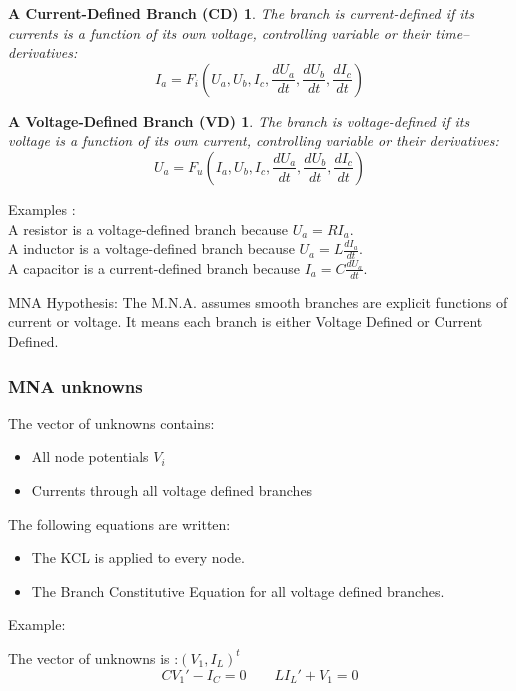 \frame
{
\newtheorem{mur}{A Current-Defined Branch (CD)}
\begin{mur}
The branch is current-defined if its currents is a function of its own voltage, controlling variable
or their time--derivatives:
\begin{equation}\label{CD}I_{a}=F_{i}(U_{a},U_{b},I_{c},\frac{dU_a}{dt},\frac{dU_b}{dt},\frac{dI_{c}}{dt})\end{equation}
\end{mur}
\newtheorem{mur_}{A Voltage-Defined Branch (VD)}
\begin{mur_}
The branch is voltage-defined if its voltage is a function of its own current, controlling variable
or their derivatives:
\begin{equation}\label{VD}U_{a}=F_{u}(I_{a},U_{b},I_{c},\frac{dU_a}{dt},\frac{dU_b}{dt},\frac{dI_{c}}{dt})\end{equation}
\end{mur_}
Examples : \\
A resistor is a voltage-defined branch because $U_{a}=RI_{a}$.\\
A inductor is a voltage-defined branch because $U_{a}=L\frac{dI_{a}}{dt}$.\\
A capacitor is a current-defined branch because $I_{a}=C\frac{dU_{a}}{dt}$.\\

 \begin{block}{MNA Hypothesis:}
The M.N.A. assumes smooth branches are explicit functions of current or voltage. It means each
branch is either Voltage Defined or Current Defined.
  \end{block}
}
\frame
{
\frametitle{MNA unknowns}
 \begin{block}{The vector of unknowns contains:}
\begin{itemize}
\item All node potentials $V_{i}$
\item Currents through all voltage defined branches
\end{itemize}
\end{block}

 \begin{block}{The following equations are written:}
\begin{itemize}
\item The KCL is applied to every node.
\item The Branch Constitutive Equation for all voltage defined branches.
\end{itemize}
\end{block}
Example:
  \begin{figure}[h]
   \centerline{
   \scalebox{0.5}{
    
  }
 } 
 \end{figure}

The vector of unknowns is :$(V_{1},I_{L})^{t}$
\[CV_{1}'-I_{C}=0 \qquad LI_{L}'+V_{1}=0\]

}